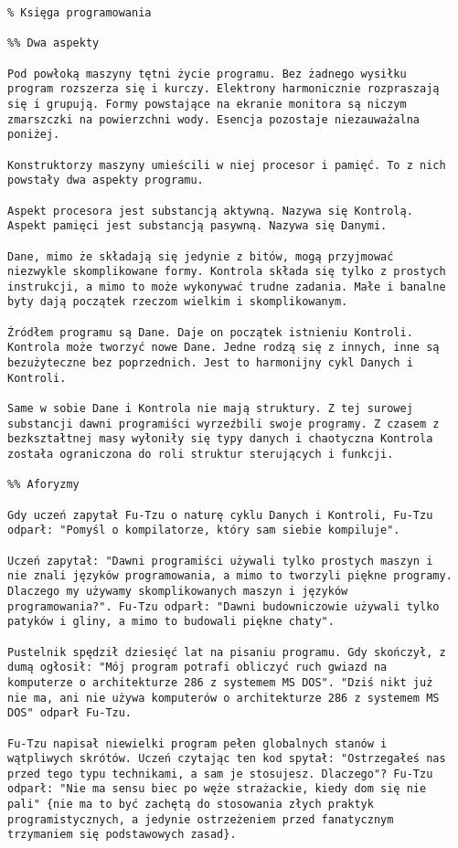   
\begin{verbatim} 
% Księga programowania

%% Dwa aspekty

Pod powłoką maszyny tętni życie programu. Bez żadnego wysiłku
program rozszerza się i kurczy. Elektrony harmonicznie rozpraszają
się i grupują. Formy powstające na ekranie monitora są niczym
zmarszczki na powierzchni wody. Esencja pozostaje niezauważalna
poniżej.

Konstruktorzy maszyny umieścili w niej procesor i pamięć. To z nich
powstały dwa aspekty programu.

Aspekt procesora jest substancją aktywną. Nazywa się Kontrolą.
Aspekt pamięci jest substancją pasywną. Nazywa się Danymi.

Dane, mimo że składają się jedynie z bitów, mogą przyjmować
niezwykle skomplikowane formy. Kontrola składa się tylko z prostych
instrukcji, a mimo to może wykonywać trudne zadania. Małe i banalne
byty dają początek rzeczom wielkim i skomplikowanym.

Źródłem programu są Dane. Daje on początek istnieniu Kontroli.
Kontrola może tworzyć nowe Dane. Jedne rodzą się z innych, inne są
bezużyteczne bez poprzednich. Jest to harmonijny cykl Danych i
Kontroli.

Same w sobie Dane i Kontrola nie mają struktury. Z tej surowej
substancji dawni programiści wyrzeźbili swoje programy. Z czasem z
bezkształtnej masy wyłoniły się typy danych i chaotyczna Kontrola
została ograniczona do roli struktur sterujących i funkcji.

%% Aforyzmy

Gdy uczeń zapytał Fu-Tzu o naturę cyklu Danych i Kontroli, Fu-Tzu
odparł: "Pomyśl o kompilatorze, który sam siebie kompiluje".

Uczeń zapytał: "Dawni programiści używali tylko prostych maszyn i
nie znali języków programowania, a mimo to tworzyli piękne programy.
Dlaczego my używamy skomplikowanych maszyn i języków
programowania?". Fu-Tzu odparł: "Dawni budowniczowie używali tylko
patyków i gliny, a mimo to budowali piękne chaty".

Pustelnik spędził dziesięć lat na pisaniu programu. Gdy skończył, z
dumą ogłosił: "Mój program potrafi obliczyć ruch gwiazd na
komputerze o architekturze 286 z systemem MS DOS". "Dziś nikt już
nie ma, ani nie używa komputerów o architekturze 286 z systemem MS
DOS" odparł Fu-Tzu.

Fu-Tzu napisał niewielki program pełen globalnych stanów i
wątpliwych skrótów. Uczeń czytając ten kod spytał: "Ostrzegałeś nas
przed tego typu technikami, a sam je stosujesz. Dlaczego"? Fu-Tzu
odparł: "Nie ma sensu biec po węże strażackie, kiedy dom się nie
pali" {nie ma to być zachętą do stosowania złych praktyk
programistycznych, a jedynie ostrzeżeniem przed fanatycznym
trzymaniem się podstawowych zasad}.


\end{verbatim}
